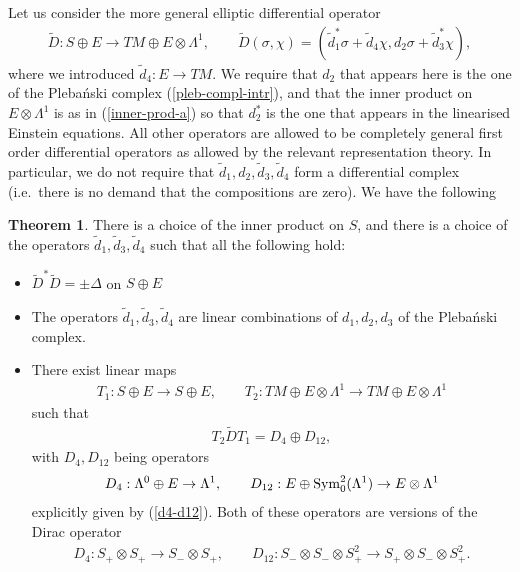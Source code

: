 \documentclass[10pt]{report}
\newcommand{\pleb}[0]{Pleba\'nski}
\theoremstyle{definition}
\newtheorem{theorem}{Theorem}[chapter]
\begin{document}
Let us consider the more general elliptic differential operator 
\begin{align}
\tilde{D}: S\oplus E \to TM \oplus E\otimes\Lambda^1, \qquad   \tilde{D}(\sigma,\chi) = (\tilde{d}_1^* \sigma + \tilde{d}_4 \chi, d_2 \sigma + \tilde{d}_3^*\chi),
\end{align}
where we introduced $\tilde{d}_4: E\to TM$. We require that $d_2$ that appears here is the one of the \pleb{} complex (\ref{pleb-compl-intr}), and that the inner product on $E\otimes \Lambda^1$ is as in (\ref{inner-prod-a}) so that $d_2^*$ is the one that appears in the linearised Einstein equations. All other operators are allowed to be completely general first order differential operators as allowed by the relevant representation theory. In particular, we do not require that $\tilde{d}_1, d_2, \tilde{d}_3, \tilde{d}_4$ form a differential complex (i.e.\ there is no demand that the compositions are zero). We have the following
\begin{theorem} There is a choice of the inner product on $S$, and there is a choice of the operators $\tilde{d}_1, \tilde{d}_3, \tilde{d}_4$ such that all the following hold:
\begin{itemize}
\item $\tilde{D}^* \tilde{D} =\pm \Delta$ on $S\oplus E$
\item The operators $\tilde{d}_1,\tilde{d}_3,\tilde{d}_4$ are linear combinations of $d_1, d_2, d_3$ of the \pleb{} complex. 
\item There exist linear maps
\begin{align}
T_1: S\oplus E\to S\oplus E, \qquad T_2 : TM\oplus E\otimes \Lambda^1 \to TM\oplus E\otimes \Lambda^1
\end{align}
such that 
\begin{align}\label{split}
T_2 \tilde{D} T_1 = D_4 \oplus D_{12},
\end{align}
with $D_4, D_{12}$ being operators
\begin{align}
D_4: \Lambda^0 \oplus E \to \Lambda^1, \qquad D_{12}: E \oplus {\rm Sym}^2_0(\Lambda^1) \to E\otimes \Lambda^1
\end{align}
explicitly given by (\ref{d4-d12}). Both of these operators are versions of the Dirac operator
\begin{align}
D_4: S_+\otimes S_+ \to S_-\otimes S_+, \qquad D_{12}: S_-\otimes S_-\otimes S_+^2 \to S_+\otimes S_-\otimes S_+^2.
\end{align}
\end{itemize}
\end{theorem}
\end{document}
